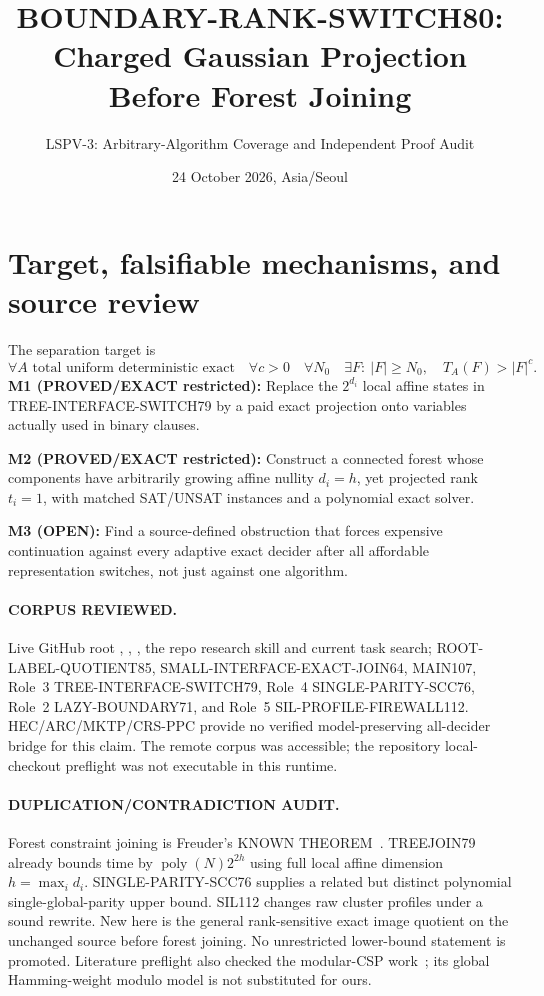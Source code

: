 \documentclass[11pt]{article}
\title{BOUNDARY-RANK-SWITCH80: Charged Gaussian Projection Before Forest Joining}
\author{LSPV-3: Arbitrary-Algorithm Coverage and Independent Proof Audit}
\date{24 October 2026, Asia/Seoul}
\begin{document}
\maketitle
\begin{center}\end{center}

\section{Target, falsifiable mechanisms, and source review}
The separation target is
\[
\forall A\text{ total uniform deterministic exact}\quad\forall c>0\quad
\forall N_0\quad\exists F:\ |F|\ge N_0,\quad T_A(F)>|F|^c. \tag{1}
\]
\noindent\textbf{M1 (PROVED/EXACT restricted):} Replace the $2^{d_i}$
local affine states in TREE-INTERFACE-SWITCH79 by a paid exact
projection onto variables actually used in binary clauses.
\par\noindent\textbf{M2 (PROVED/EXACT restricted):}
Construct a connected forest whose components have arbitrarily growing
affine nullity $d_i=h$, yet projected rank $t_i=1$, with matched SAT/UNSAT
instances and a polynomial exact solver.
\par\noindent\textbf{M3 (OPEN):} Find a source-defined obstruction
that forces expensive continuation against every adaptive exact decider
after all affordable representation switches, not just against one algorithm.

\paragraph{CORPUS REVIEWED.}
Live GitHub root , , ,
the repo research skill and current task search; ROOT-LABEL-QUOTIENT85,
SMALL-INTERFACE-EXACT-JOIN64, MAIN107, Role~3 TREE-INTERFACE-SWITCH79,
Role~4 SINGLE-PARITY-SCC76, Role~2 LAZY-BOUNDARY71,
and Role~5 SIL-PROFILE-FIREWALL112. HEC/ARC/MKTP/CRS-PPC
provide no verified model-preserving all-decider bridge for this claim.
The remote corpus was accessible; the repository local-checkout preflight
was not executable in this runtime.
\paragraph{DUPLICATION/CONTRADICTION AUDIT.}
Forest constraint joining is Freuder's KNOWN THEOREM~\cite{freuder}.
TREEJOIN79 already bounds time by $\operatorname{poly}(N)2^{2h}$
using full local affine dimension $h=\max_i d_i$.
SINGLE-PARITY-SCC76 supplies a related but distinct polynomial
single-global-parity upper bound. SIL112 changes raw cluster
profiles under a sound rewrite. New here is the general rank-sensitive
exact image quotient on the unchanged source before forest joining.
No unrestricted lower-bound statement is promoted. Literature
preflight also checked the modular-CSP work~\cite{bgg};
its global Hamming-weight modulo model is not substituted for ours.
\end{document}
